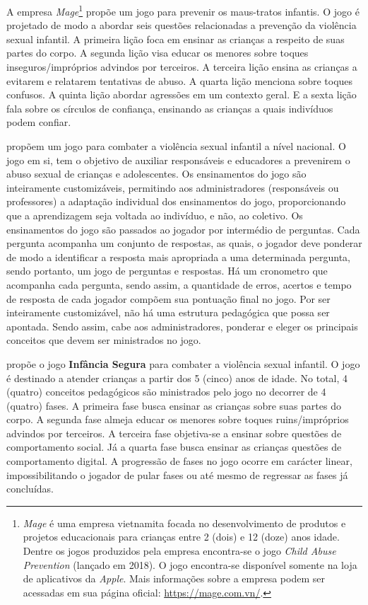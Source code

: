A empresa \textit{Mage}\footnote{\textit{Mage} é uma empresa vietnamita focada no desenvolvimento de produtos e projetos educacionais para crianças entre 2 (dois) e 12 (doze) anos idade. Dentre os jogos produzidos pela empresa encontra-se o jogo \textit{Child Abuse Prevention} (lançado em 2018). O jogo encontra-se disponível somente na loja de aplicativos da \textit{Apple}. Mais informações sobre a empresa podem ser acessadas em sua página oficial: \url{https://mage.com.vn/}.} propõe um jogo para prevenir os maus-tratos infantis. O jogo é projetado de modo a abordar seis questões relacionadas a prevenção da violência sexual infantil. A primeira lição foca em ensinar as crianças a respeito de suas partes do corpo. A segunda lição visa educar os menores sobre toques inseguros/impróprios advindos por terceiros. A terceira lição ensina as crianças a evitarem e relatarem tentativas de abuso. A quarta lição menciona sobre toques confusos. A quinta lição abordar agressões em um contexto geral. E a sexta lição fala sobre os círculos de confiança, ensinando as crianças a quais indivíduos podem confiar.

 propõem um jogo para combater a violência sexual infantil a nível nacional. O jogo em si, tem o objetivo de auxiliar responsáveis e educadores a prevenirem o abuso sexual de crianças e adolescentes. Os ensinamentos do jogo são inteiramente customizáveis, permitindo aos administradores (responsáveis ou professores) a adaptação individual dos ensinamentos do jogo, proporcionando que a aprendizagem seja voltada ao indivíduo, e não, ao coletivo. Os ensinamentos do jogo são passados ao jogador por intermédio de perguntas. Cada pergunta acompanha um conjunto de respostas, as quais, o jogador deve ponderar de modo a identificar a resposta mais apropriada a uma determinada pergunta, sendo portanto, um jogo de perguntas e respostas. Há um cronometro que acompanha cada pergunta, sendo assim, a quantidade de erros, acertos e tempo de resposta de cada jogador compõem sua pontuação final no jogo. Por ser inteiramente customizável, não há uma estrutura pedagógica que possa ser apontada. Sendo assim, cabe aos administradores, ponderar e eleger os principais conceitos que devem ser ministrados no jogo.

 propõe o jogo \textbf{Infância Segura} para combater a violência sexual infantil. O jogo é destinado a atender crianças a partir dos 5 (cinco) anos de idade. No total, 4 (quatro) conceitos pedagógicos são ministrados pelo jogo no decorrer de 4 (quatro) fases. A primeira fase busca ensinar as crianças sobre suas partes do corpo. A segunda fase almeja educar os menores sobre toques ruins/impróprios advindos por terceiros. A terceira fase objetiva-se a ensinar sobre questões de comportamento social. Já a quarta fase busca ensinar as crianças questões de comportamento digital. A progressão de fases no jogo ocorre em carácter linear, impossibilitando o jogador de pular fases ou até mesmo de regressar as fases já concluídas. 

